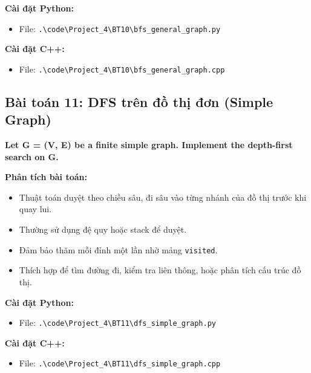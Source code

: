 \documentclass[12pt,a4paper]{article}
\begin{document}
\textbf{Cài đặt Python:}
\begin{itemize}[label=\textbullet]
   \item File: \texttt{.\textbackslash code\textbackslash Project\_4\textbackslash BT10\textbackslash bfs\_general\_graph.py}
\end{itemize}

\textbf{Cài đặt C++:}
\begin{itemize}[label=\textbullet]
   \item File: \texttt{.\textbackslash code\textbackslash Project\_4\textbackslash BT10\textbackslash bfs\_general\_graph.cpp}
\end{itemize}



\subsection{Bài toán 11: DFS trên đồ thị đơn (Simple Graph)}

\begin{problembox}
    \textbf{Let G = (V, E) be a finite simple graph. Implement the depth-first search on G.} 
\end{problembox}

\textbf{Phân tích bài toán:}
\begin{itemize}[label=\textbullet]
    \item Thuật toán duyệt theo chiều sâu, đi sâu vào từng nhánh của đồ thị trước khi quay lui.
    \item Thường sử dụng đệ quy hoặc stack để duyệt.
    \item Đảm bảo thăm mỗi đỉnh một lần nhờ mảng \texttt{visited}.
    \item Thích hợp để tìm đường đi, kiểm tra liên thông, hoặc phân tích cấu trúc đồ thị.
\end{itemize}

\textbf{Cài đặt Python:}
\begin{itemize}[label=\textbullet]
   \item File: \texttt{.\textbackslash code\textbackslash Project\_4\textbackslash BT11\textbackslash dfs\_simple\_graph.py}
\end{itemize}

\textbf{Cài đặt C++:}
\begin{itemize}[label=\textbullet]
   \item File: \texttt{.\textbackslash code\textbackslash Project\_4\textbackslash BT11\textbackslash dfs\_simple\_graph.cpp}
\end{itemize}
\end{document}
